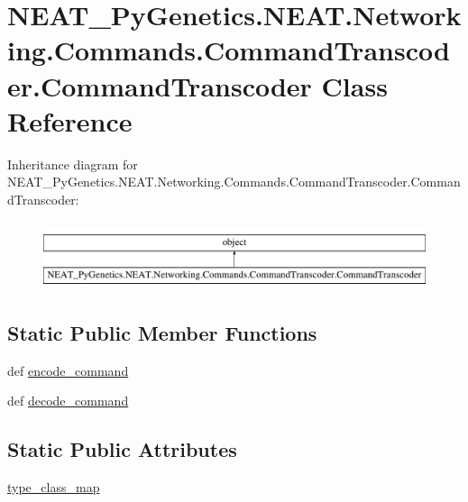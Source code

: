 \hypertarget{classNEAT__PyGenetics_1_1NEAT_1_1Networking_1_1Commands_1_1CommandTranscoder_1_1CommandTranscoder}{}\section{N\+E\+A\+T\+\_\+\+Py\+Genetics.\+N\+E\+A\+T.\+Networking.\+Commands.\+Command\+Transcoder.\+Command\+Transcoder Class Reference}
\label{classNEAT__PyGenetics_1_1NEAT_1_1Networking_1_1Commands_1_1CommandTranscoder_1_1CommandTranscoder}
Inheritance diagram for N\+E\+A\+T\+\_\+\+Py\+Genetics.\+N\+E\+A\+T.\+Networking.\+Commands.\+Command\+Transcoder.\+Command\+Transcoder\+:\begin{figure}[H]
\begin{center}
\leavevmode
\includegraphics[height=2.000000cm]{classNEAT__PyGenetics_1_1NEAT_1_1Networking_1_1Commands_1_1CommandTranscoder_1_1CommandTranscoder}
\end{center}
\end{figure}
\subsection*{Static Public Member Functions}
\begin{DoxyCompactItemize}
\item 
def \hyperlink{classNEAT__PyGenetics_1_1NEAT_1_1Networking_1_1Commands_1_1CommandTranscoder_1_1CommandTranscoder_a173c5fa30eabf9dc236f761803dfd1df}{encode\+\_\+command}
\item 
def \hyperlink{classNEAT__PyGenetics_1_1NEAT_1_1Networking_1_1Commands_1_1CommandTranscoder_1_1CommandTranscoder_aebdcf1865dd3c040c341f00e88c8d387}{decode\+\_\+command}
\end{DoxyCompactItemize}
\subsection*{Static Public Attributes}
\begin{DoxyCompactItemize}
\item 
\hyperlink{classNEAT__PyGenetics_1_1NEAT_1_1Networking_1_1Commands_1_1CommandTranscoder_1_1CommandTranscoder_a161a64d3c2586008802d174ebc5b6e4b}{type\+\_\+class\+\_\+map}
\end{DoxyCompactItemize}


